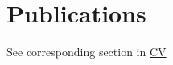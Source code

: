 \documentclass[11pt,letterpaper]{article}
\begin{document}
\section*{Publications}
See corresponding section in \href{https://ljding94.github.io/file/cv_resume/cv.pdf}{CV}


\end{document}
